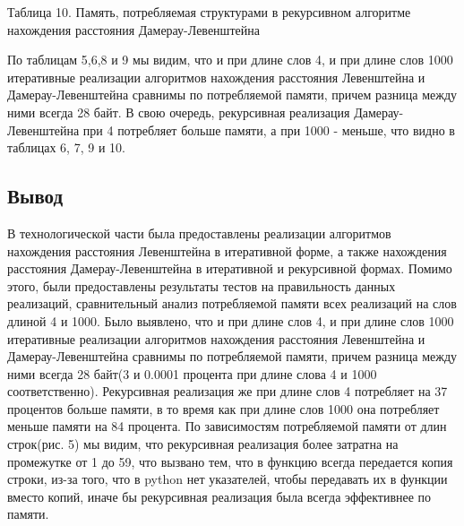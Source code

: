 \documentclass[a4paper, 14pt]{article}
\begin{document}
	\begin{center}
  	Таблица 10. Память, потребляемая структурами в рекурсивном алгоритме нахождения расстояния Дамерау-Левенштейна\\
	\end{center}

	
	\begin{flushleft}
	По таблицам 5,6,8 и 9 мы видим, что и при длине слов 4, и при длине слов 1000 итеративные реализации алгоритмов нахождения расстояния Левенштейна и Дамерау-Левенштейна сравнимы по потребляемой памяти, причем разница между ними всегда 28 байт. В свою очередь, рекурсивная реализация Дамерау-Левенштейна при 4 потребляет больше памяти, а при 1000 - меньше, что видно в таблицах 6, 7, 9 и 10.
	\end{flushleft}
  \begin{center}

   \subsection{Вывод}
    \end{center}  
    
	В технологической части была предоставлены реализации алгоритмов нахождения расстояния Левенштейна в итеративной форме, а также нахождения расстояния Дамерау-Левенштейна в итеративной и рекурсивной формах. Помимо этого, были предоставлены результаты тестов на правильность данных реализаций, сравнительный анализ потребляемой памяти всех реализаций на слов длиной 4 и 1000. Было выявлено, что и при длине слов 4, и при длине слов 1000 итеративные реализации алгоритмов нахождения расстояния Левенштейна и Дамерау-Левенштейна сравнимы по потребляемой памяти, причем разница между ними всегда 28 байт(3 и 0.0001 процента при длине слова 4 и 1000 соответственно). Рекурсивная реализация же при длине слов 4 потребляет на 37 процентов больше памяти, в то время как при длине слов 1000 она потребляет меньше памяти на 84 процента. По зависимостям потребляемой памяти от длин строк(рис. 5) мы видим, что рекурсивная реализация более затратна на промежутке от 1 до 59, что вызвано тем, что в функцию всегда передается копия строки, из-за того, что в python нет указателей, чтобы передавать их в функции вместо копий, иначе бы рекурсивная реализация была всегда эффективнее по памяти.	 
\end{document}
